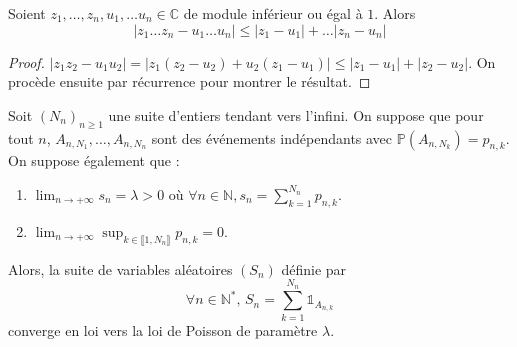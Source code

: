 





  \begin{lemma}
    \label{theoreme-des-evenements-rares-de-poisson-1}
    Soient $z_1, \dots, z_n, u_1, \dots u_n \in \mathbb{C}$ de module inférieur ou égal à $1$. Alors
    \[ |z_1 \dots z_n - u_1 \dots u_n| \leq |z_1-u_1| + \dots |z_n - u_n| \]
  \end{lemma}

  \begin{proof}
    $|z_1 z_2 - u_1 u_2| = |z_1(z_2 - u_2) + u_2(z_1 - u_1)| \leq |z_1 - u_1| + |z_2 - u_2|$. On procède ensuite par récurrence pour montrer le résultat.
  \end{proof}


  \begin{theorem}
    Soit $(N_n)_{n \geq 1}$ une suite d'entiers tendant vers l'infini. On suppose que pour tout $n$, $A_{n,N_1}, \dots , A_{n,N_n}$ sont des événements indépendants avec $\mathbb{P}(A_{n,N_k}) = p_{n,k}$. On suppose également que :
    \begin{enumerate}[label=(\roman*)]
      \item $\lim_{n \rightarrow +\infty} s_n = \lambda > 0$ où $\forall n \in \mathbb{N}, s_n = \sum_{k=1}^{N_n} p_{n,k}$.
      \item $\lim_{n \rightarrow +\infty} \sup_{k \in \llbracket 1, N_n \rrbracket} p_{n,k} = 0$.
    \end{enumerate}
    Alors, la suite de variables aléatoires $(S_n)$ définie par
    \[ \forall n \in \mathbb{N}^*, \, S_n = \sum_{k=1}^{N_n} \mathbb{1}_{A_{n,k}} \]
    converge en loi vers la loi de Poisson de paramètre $\lambda$.
  \end{theorem}

